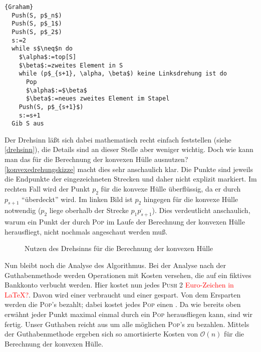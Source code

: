\documentclass[ngerman,draft,parskip=half*,twoside]{scrreprt}
\theoremstyle{break}
\theoremstyle{nonumberbreak}
\newcommand*{\OO}{\mathcal{O}}      %
\begin{document}
\begin{Algorithmus}[H]
\begin{lstlisting}[frame=tlrb, mathescape=true, title=\textsc{Graham}, gobble=1]{Graham}
  Push(S, p$_n$)
  Push(S, p$_1$)
  Push(S, p$_2$)
  s:=2
  while s$\neq$n do
    $\alpha$:=top[S]
    $\beta$:=zweites Element in S
    while (p$_{s+1}, \alpha, \beta$) keine Linksdrehung ist do
      Pop
      $\alpha$:=$\beta$
      $\beta$:=neues zweites Element im Stapel
    Push(S, p$_{s+1}$)
    s:=s+1
  Gib S aus    
\end{lstlisting}
\end{Algorithmus}

Der Drehsinn läßt sich dabei mathematisch recht einfach feststellen (siehe \autoref{drehsinn}), die Details sind an dieser Stelle
aber weniger wichtig.
Doch wie kann man das für die Berechnung
der konvexen Hülle ausnutzen?  \autoref{konvexedrehungskizze} macht dies sehr anschaulich klar. Die Punkte sind jeweils die
Endpunkte der eingezeichneten Strecken und daher nicht explizit markiert. Im rechten Fall wird der Punkt $p_2$ für die konvexe Hülle
überflüssig, da er durch $p_{s+1}$ "`überdeckt"' wird. Im linken Bild ist $p_2$ hingegen für die konvexe Hülle notwendig ($p_2$
liege oberhalb der Strecke $\overline{p_1p_{s+1}}$). Dies verdeutlicht anschaulich, warum ein Punkt der durch
\textsc{Pop} im Laufe der Berechnung der konvexen Hülle herausfliegt, nicht nochmals angeschaut werden muß.

\begin{figure}[H]
\centering


\caption{Nutzen des Drehsinns für die Berechnung der konvexen Hülle}
\label{konvexedrehungskizze}
\end{figure}

Nun bleibt noch die Analyse des Algorithmus. Bei der Analyse nach der Guthabenmethode werden Operationen mit Kosten versehen, die auf ein fiktives Bankkonto
verbucht werden. Hier kostet nun jedes \textsc{Push} 2 \textcolor{red}{Euro-Zeichen in LaTeX?}. Davon wird einer verbraucht und einer
gespart. Von dem Ersparten werden die \textsc{Pop}'s bezahlt; dabei kostet jedes \textsc{Pop} einen . Da wie bereits oben erwähnt jeder
Punkt maximal einmal durch ein \textsc{Pop} herausfliegen kann, sind wir fertig. Unser Guthaben reicht aus um alle möglichen
\textsc{Pop}'s zu bezahlen. Mittels der Guthabenmethode ergeben sich so amortisierte Kosten von $\OO(n)$ für die Berechnung der konvexen
Hülle.
\end{document}
